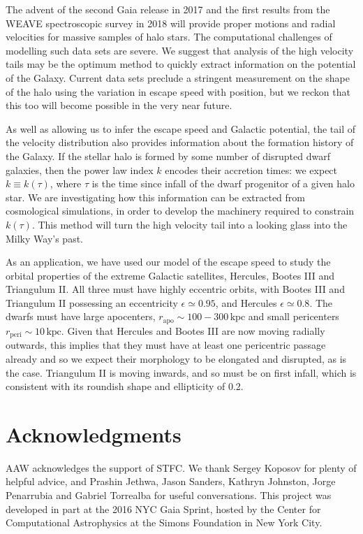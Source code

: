 \documentclass[useAMS,twocolumn,usenatbib]{mn2e}
\def\kpc{{\,\mathrm{kpc}}}
\def\rp{{r_\mathrm{peri}}}
\def\ra{{r_\mathrm{apo}}}
\begin{document}
The advent of the second Gaia release in 2017 and the first results from the WEAVE spectroscopic survey in 2018 will provide proper motions and radial velocities for massive samples of halo stars. 
The computational challenges of modelling such data sets are severe. 
We suggest that analysis of the high velocity tails may be the optimum method to quickly extract information on the potential of the Galaxy.  
Current data sets preclude a stringent measurement on the shape of the halo using the variation in escape speed with position, but we reckon that this too will become possible in the very near future.

As well as allowing us to infer the escape speed and Galactic potential, the tail of the velocity distribution also provides information about the formation history of the Galaxy.
If the stellar halo is formed by some number of disrupted dwarf galaxies, then the power law index $k$ encodes their accretion times: we expect $k \equiv k(\tau)$, where $\tau$ is the time since infall of the dwarf progenitor of a given halo star.
We are investigating how this information can be extracted from cosmological simulations, in order to develop the machinery required to constrain $k(\tau)$. 
This method will turn the high velocity tail into a looking glass into the Milky Way's past.

As an application, we have used our model of the escape speed to study the orbital properties of the extreme Galactic satellites, Hercules, Bootes III and Triangulum II. 
All three must have highly eccentric orbits, with Bootes III and Triangulum II possessing an eccentricity $\epsilon \simeq 0.95$, and Hercules
$\epsilon \simeq 0.8$. 
The dwarfs must have large apocenters, $\ra \sim 100 - 300\kpc$ and small pericenters $\rp \sim 10\kpc$. 
Given that Hercules and Bootes III are now moving radially outwards, this implies that they must have at least one pericentric passage already and so we expect their morphology to be elongated and disrupted, as is the case. 
Triangulum II is moving inwards, and so must be on first infall, which is consistent with its roundish shape and ellipticity of 0.2.

\section*{Acknowledgments}
AAW acknowledges the support of STFC. 
We thank Sergey Koposov for plenty of helpful advice, and Prashin Jethwa, Jason Sanders, Kathryn Johnston, Jorge Penarrubia and Gabriel Torrealba for useful conversations. 
This project was developed in part at the 2016 NYC Gaia Sprint, hosted by the Center for Computational Astrophysics at the Simons Foundation in New York City.
\end{document}

